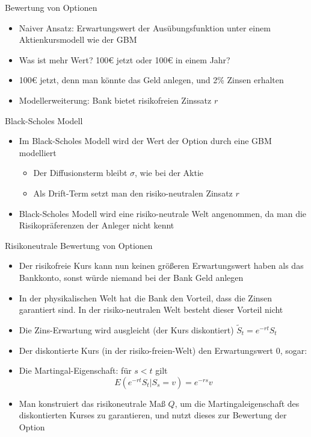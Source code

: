 \documentclass{beamer}
\begin{document}
\begin{frame}{Bewertung von Optionen}
  \begin{itemize}
      \item Naiver Ansatz: Erwartungswert der Ausübungsfunktion unter einem Aktienkursmodell wie der GBM
      \pause
      \item Was ist mehr Wert? 100€ jetzt oder 100€ in einem Jahr?
      \pause
      \item 100€ jetzt, denn man könnte das Geld anlegen, und 2\% Zinsen erhalten
      \item Modellerweiterung: Bank bietet risikofreien Zinssatz $r$
  \end{itemize}
\end{frame}

\begin{frame}{Black-Scholes Modell}
  \begin{itemize}
      \item Im Black-Scholes Modell wird der Wert der Option durch eine GBM modelliert
      \begin{itemize}
        \item Der Diffusionsterm bleibt $\sigma$, wie bei der Aktie
        \item Als Drift-Term setzt man den risiko-neutralen Zinsatz $r$
      \end{itemize}
      \item Black-Scholes Modell wird eine risiko-neutrale Welt angenommen, da man die Risikopräferenzen der Anleger nicht kennt
  \end{itemize}
\end{frame}

\begin{frame}{Risikoneutrale Bewertung von Optionen}
  \begin{itemize}
      \item Der risikofreie Kurs kann nun keinen größeren Erwartungswert haben als das Bankkonto, sonst würde niemand bei der Bank Geld anlegen
      \item In der physikalischen Welt hat die Bank den Vorteil, dass die Zinsen garantiert sind. In der risiko-neutralen Welt besteht dieser Vorteil nicht 
      \pause
      \item Die Zins-Erwartung wird ausgleicht (der Kurs diskontiert) $\tilde S_t = e^{-r t} S_t$
      \item Der diskontierte Kurs (in der risiko-freien-Welt) den Erwartungswert $0$, sogar:
      \item Die Martingal-Eigenschaft: für $s < t$ gilt $$E(e^{-rt}S_t | S_s = v) = e^{-rs} v$$
      \pause
      \item Man konstruiert das risikoneutrale Maß $Q$, um die Martingaleigenschaft des diskontierten Kurses zu garantieren, und nutzt dieses zur Bewertung der Option
  \end{itemize}
\end{frame}
\end{document}
